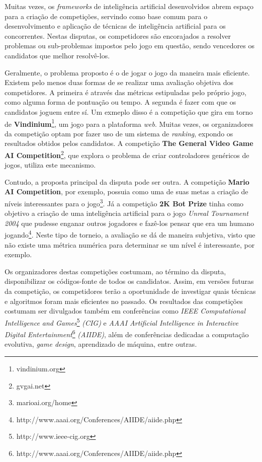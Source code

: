 Muitas vezes, os \textit{frameworks} de inteligência artificial desenvolvidos
abrem espaço para a criação de competições, servindo como base comum para o
desenvolvimento e aplicação de técnicas de inteligência artificial para os
concorrentes. Nestas disputas, os competidores são encorajados a resolver
problemas ou sub-problemas impostos pelo jogo em questão, sendo vencedores os
candidatos que melhor resolvê-los.

Geralmente, o problema proposto é o de jogar o jogo da maneira mais eficiente.
Existem pelo menos duas formas de se realizar uma avaliação objetiva dos
competidores. A primeira é através das métricas estipuladas pelo próprio jogo,
como alguma forma de pontuação ou tempo. A segunda é fazer com que os candidatos
joguem entre sí. Um exmeplo disso é a competição que gira em torno de
\textbf{Vindinium}\footnote{vindinium.org}, um jogo para a plataforma
\textit{web}. Muitas vezes, os organizadores da competição optam por fazer uso
de um sistema de \textit{ranking}, expondo os resultados obtidos pelos
candidatos. A competição \textbf{The General Video Game AI
Competition}\footnote{gvgai.net}, que explora o problema de criar controladores
genéricos de jogos, utiliza este mecanismo.

Contudo, a proposta principal da disputa pode ser outra. A competição
\textbf{Mario AI Competition}, por exemplo, possuia como uma de suas metas a
criação de níveis interessantes para o jogo\footnote{marioai.org/home}. Já a
competição \textbf{2K Bot Prize} tinha como objetivo a criação de uma
inteligência artificial para o jogo \textit{Unreal Tournament 2004} que pudesse
enganar outros jogadores e fazê-los pensar que era um humano
jogando\footnote{http://www.aaai.org/Conferences/AIIDE/aiide.php}. Neste tipo
de torneio, a avaliação se dá de maneira subjetiva, visto que não existe uma
métrica numérica para determinar se um nível é interessante, por exemplo.

Os organizadores destas competições costumam, ao término da disputa,
disponibilizar os códigos-fonte de todos os candidatos. Assim, em versões
futuras da competição, os competidores terão a oportunidade de investigar quais
técnicas e algoritmos foram mais eficientes no passado. Os resultados das
competições costumam ser divulgados também em conferências como \textit{IEEE
Computational Intelligence and Games}\footnote{http://www.ieee-cig.org}
\textit{(CIG)} e \textit{AAAI Artificial Intelligence in Interactive Digital
Entertainment}\footnote{http://www.aaai.org/Conferences/AIIDE/aiide.php}
\textit{(AIIDE)}, além de conferências dedicadas a computação evolutiva,
\textit{game design}, aprendizado de máquina, entre outras.


